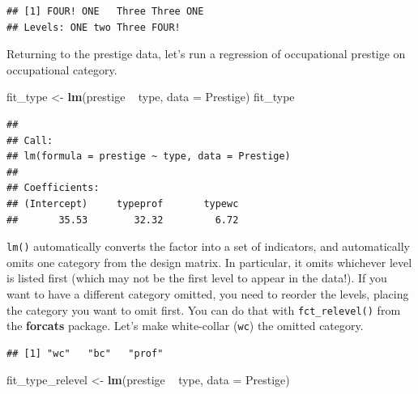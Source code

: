 \documentclass[12pt,oneside,openany]{book}
\newenvironment{Shaded}{\begin{snugshade}}{\end{snugshade}}
\newcommand{\KeywordTok}[1]{\textcolor[rgb]{0.13,0.29,0.53}{\textbf{{#1}}}}
\newcommand{\DataTypeTok}[1]{\textcolor[rgb]{0.13,0.29,0.53}{{#1}}}
\newcommand{\StringTok}[1]{\textcolor[rgb]{0.31,0.60,0.02}{{#1}}}
\newcommand{\NormalTok}[1]{{#1}}
\begin{document}
\begin{verbatim}
## [1] FOUR! ONE   Three Three ONE  
## Levels: ONE two Three FOUR!
\end{verbatim}

Returning to the prestige data, let's run a regression of occupational
prestige on occupational category.

\begin{Shaded}
\begin{Highlighting}[]
\NormalTok{fit_type <-}\StringTok{ }\KeywordTok{lm}\NormalTok{(prestige ~}\StringTok{ }\NormalTok{type, }\DataTypeTok{data =} \NormalTok{Prestige)}
\NormalTok{fit_type}
\end{Highlighting}
\end{Shaded}

\begin{verbatim}
## 
## Call:
## lm(formula = prestige ~ type, data = Prestige)
## 
## Coefficients:
## (Intercept)     typeprof       typewc  
##       35.53        32.32         6.72
\end{verbatim}

\texttt{lm()} automatically converts the factor into a set of
indicators, and automatically omits one category from the design matrix.
In particular, it omits whichever level is listed first (which may not
be the first level to appear in the data!). If you want to have a
different category omitted, you need to reorder the levels, placing the
category you want to omit first. You can do that with
\texttt{fct\_relevel()} from the \textbf{forcats} package. Let's make
white-collar (\texttt{wc}) the omitted category.

\begin{Shaded}
\end{Shaded}

\begin{verbatim}
## [1] "wc"   "bc"   "prof"
\end{verbatim}

\begin{Shaded}
\begin{Highlighting}[]
\NormalTok{fit_type_relevel <-}\StringTok{ }\KeywordTok{lm}\NormalTok{(prestige ~}\StringTok{ }\NormalTok{type, }\DataTypeTok{data =} \NormalTok{Prestige)}
\end{Highlighting}
\end{Shaded}
\end{document}
